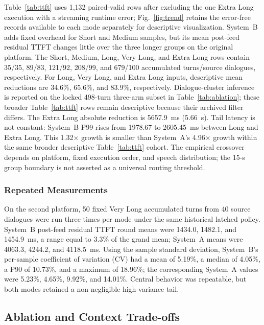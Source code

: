 \documentclass[conference]{IEEEtran}
\begin{document}
Table~\ref{tab:ttft} uses 1,132 paired-valid rows after excluding the one Extra Long execution with a streaming runtime error; Fig.~\ref{fig:trend} retains the error-free records available to each mode separately for descriptive visualization. System~B adds fixed overhead for Short and Medium samples, but its mean post-feed residual TTFT changes little over the three longer groups on the original platform. The Short, Medium, Long, Very Long, and Extra Long rows contain 35/35, 89/83, 121/92, 208/99, and 679/100 accumulated turns/source dialogues, respectively. For Long, Very Long, and Extra Long inputs, descriptive mean reductions are 34.6\%, 65.6\%, and 83.9\%, respectively. Dialogue-cluster inference is reported on the locked 498-turn three-arm subset in Table~\ref{tab:ablation}; these broader Table~\ref{tab:ttft} rows remain descriptive because their archived filter differs. The Extra Long absolute reduction is 5657.9~ms (5.66~s). Tail latency is not constant: System~B P99 rises from 1978.67 to 2605.45~ms between Long and Extra Long. This 1.32$\times$ growth is smaller than System~A's 4.96$\times$ growth within the same broader descriptive Table~\ref{tab:ttft} cohort. The empirical crossover depends on platform, fixed execution order, and speech distribution; the 15-s group boundary is not asserted as a universal routing threshold.

\subsubsection{Repeated Measurements}

On the second platform, 50 fixed Very Long accumulated turns from 40 source dialogues were run three times per mode under the same historical latched policy. System~B post-feed residual TTFT round means were 1434.0, 1482.1, and 1454.9~ms, a range equal to 3.3\% of the grand mean; System~A means were 4063.3, 4244.2, and 4118.5~ms. Using the sample standard deviation, System~B's per-sample coefficient of variation (CV) had a mean of 5.19\%, a median of 4.05\%, a P90 of 10.73\%, and a maximum of 18.96\%; the corresponding System~A values were 5.23\%, 4.65\%, 9.92\%, and 14.01\%. Central behavior was repeatable, but both modes retained a non-negligible high-variance tail.

\subsection{Ablation and Context Trade-offs}
\end{document}
